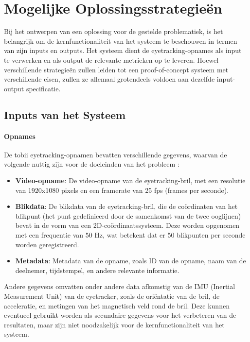 \chapter{Mogelijke Oplossingsstrategieën}
\label{ch:oplossingsstrategieen}

Bij het ontwerpen van een oplossing voor de gestelde problematiek, is het belangrijk om de 
kernfunctionaliteit van het systeem te beschouwen in termen van zijn inputs en outputs. 
Het systeem dient de eyetracking-opnames als input te verwerken en als output de relevante metrieken op te leveren.
Hoewel verschillende strategieën zullen leiden tot een proof-of-concept systeem met verschillende eisen, 
zullen ze allemaal grotendeels voldoen aan dezelfde input-output specificatie.


\section{Inputs van het Systeem}

\subsubsection{Opnames}

De tobii eyetracking-opnamen bevatten verschillende gegevens, waarvan de volgende nuttig zijn voor de 
doeleinden van het probleem \autocite{Tobii2023}:
\begin{itemize}
    \item \textbf{Video-opname}: De video-opname van de eyetracking-bril, met een resolutie van 1920x1080 pixels en een framerate van 25 fps (frames per seconde).
    \item \textbf{Blikdata}: De blikdata van de eyetracking-bril, die de coördinaten van het blikpunt 
    (het punt gedefinieerd door de samenkomst van de twee ooglijnen) bevat in de vorm van een 2D-coördinaatssysteem.
    Deze worden opgenomen met een frequentie van 50 Hz, wat betekent dat er 50 blikpunten per seconde worden geregistreerd.
    \item \textbf{Metadata}: Metadata van de opname, zoals ID van de opname, naam van de deelnemer, tijdstempel, en andere relevante informatie.
\end{itemize}

Andere gegevens omvatten onder andere data afkomstig van de IMU (Inertial Measurement Unit) van de eyetracker, 
zoals de oriëntatie van de bril, de acceleratie, en metingen van het magnetisch veld rond de bril.
Deze kunnen eventueel gebruikt worden als secundaire gegevens voor het verbeteren van de resultaten, 
maar zijn niet noodzakelijk voor de kernfunctionaliteit van het systeem.

